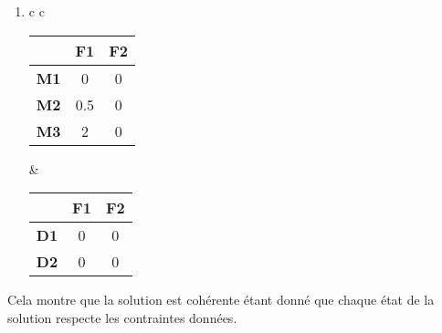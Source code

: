 \begin{enumerate}
\begin{table}[H]
\begin{tabular}{c c}
\end{tabular}
\end{table}

\item
\begin{table}[H]
\centering
\begin{tabular}{c c}

\begin{tabular}{|c|c|c|}
\hline
\textbf{} & \textbf{F1} & \textbf{F2} \\
\hline
\textbf{M1} & 0 & 0 \\
\textbf{M2} & 0.5 & 0 \\
\textbf{M3} & 2 & 0 \\
\hline
\end{tabular}
&
\begin{tabular}{|c|c|c|}
\hline
\textbf{} & \textbf{F1} & \textbf{F2} \\
\hline
\textbf{D1} & 0 & 0 \\
\textbf{D2} & 0 & 0 \\
\hline
\end{tabular}

\end{tabular}
\end{table}
\end{enumerate}

Cela montre que la solution est cohérente étant donné que chaque état de la solution respecte les contraintes données.



